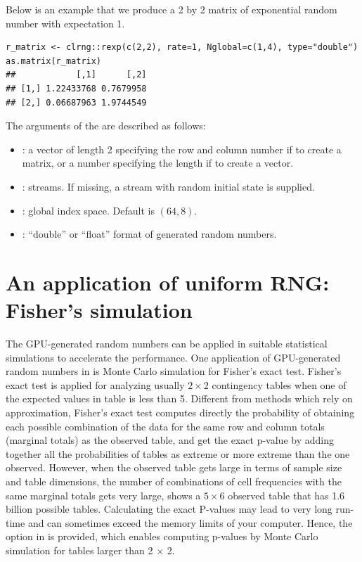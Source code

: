 \documentclass[article,nojss]{jss}\usepackage[]{graphicx}\usepackage[]{color}
\makeatletter
\newenvironment{kframe}{%
 \def\at@end@of@kframe{}%
 \ifinner\ifhmode%
  \def\at@end@of@kframe{\end{minipage}}%
  \begin{minipage}{\columnwidth}%
 \fi\fi%
 \def\FrameCommand##1{\hskip\@totalleftmargin \hskip-\fboxsep
 \colorbox{shadecolor}{##1}\hskip-\fboxsep
     \hskip-\linewidth \hskip-\@totalleftmargin \hskip\columnwidth}%
 \MakeFramed {\advance\hsize-\width
   \@totalleftmargin\z@ \linewidth\hsize
   \@setminipage}}%
 {\par\unskip\endMakeFramed%
 \at@end@of@kframe}
\newenvironment{knitrout}{}{} %
\newcommand{\fct}[1]{\code{#1()}}
\makeatother
\begin{document}
Below is an example that we produce a 2 by 2 matrix of exponential random number with expectation 1.
\begin{knitrout}
\color{fgcolor}\begin{kframe}
\begin{verbatim}
r_matrix <- clrng::rexp(c(2,2), rate=1, Nglobal=c(1,4), type="double")
as.matrix(r_matrix)
##            [,1]      [,2]
## [1,] 1.22433768 0.7679958
## [2,] 0.06687963 1.9744549
\end{verbatim}
\end{kframe}
\end{knitrout}
The arguments of the \fct{clrng::rexp} are described as follows:
\begin{itemize}
\itemsep0em 
  \item {}: a vector of length 2 specifying the row and column number if to create a matrix, or a number specifying the length if to create a vector.
  \item {}: streams. If missing, a stream with random initial state is supplied.
  \item {}: global index space. Default is $(64,8)$.
  \item {}: ``double'' or ``float'' format of generated random numbers.
\end{itemize}





\section{An application of uniform RNG: Fisher's simulation}
The GPU-generated random numbers can be applied in suitable statistical simulations to accelerate the performance.
One application of GPU-generated random numbers in  is Monte Carlo simulation for Fisher's exact test. Fisher’s exact test is applied for analyzing usually $2 \times 2$ contingency tables when one of the expected values in table is less than 5. Different from methods which rely on approximation, Fisher's exact test computes directly the probability of obtaining each possible combination of the data for the same row and column totals (marginal totals) as the observed table, and get the exact p-value by adding together all the probabilities of tables as extreme or more extreme than the one observed. However, when the observed table gets large in terms of sample size and table dimensions, the number of combinations of cell frequencies with the same marginal totals gets very large, \cite[][p. 23]{mehta2011ibm} shows a $5 \times 6$ observed table that has 1.6 billion possible tables. Calculating the exact P-values may lead to very long run-time and can sometimes exceed the memory limits of your computer. Hence, the option  in \fct{stats::fisher.test} is provided, which enables computing p-values by Monte Carlo simulation for tables larger than 2 $\times$ 2. 
\end{document}
